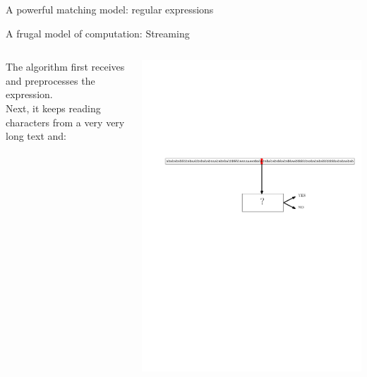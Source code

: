 \begin{frame}{A powerful matching model: regular expressions}
    \bigskip
    \pause
    \bigskip
\end{frame}

\begin{frame}{A frugal model of computation: Streaming}
\begin{columns}
    The algorithm first receives and preprocesses the expression.\\ Next, it keeps reading characters from a very very long text and:
    \begin{center}
        \includegraphics[width=\textwidth]{pictures/stream3}
    \end{center}
\end{columns}


\end{frame}

